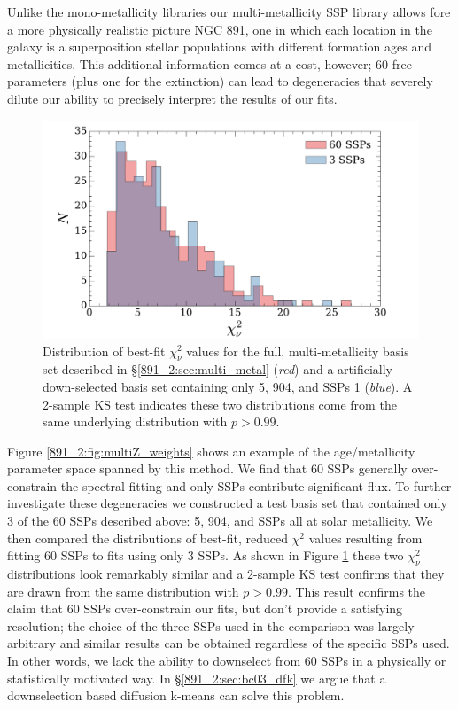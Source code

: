 Unlike the mono-metallicity libraries our multi-metallicity SSP
library allows fore a more physically realistic picture NGC 891, one
in which each location in the galaxy is a superposition stellar
populations with different formation ages and metallicities. This
additional information comes at a cost, however; 60 free parameters
(plus one for the extinction) can lead to degeneracies that severely
dilute our ability to precisely interpret the results of our fits.

\begin{figure}
  \centering
  \includegraphics[width=\columnwidth]{891_2/figs/allz_chihist.pdf}
  \caption[$\chi_{\nu}^2$ distribution for 61 and 4 parameter
    fits]{\fixspacing\label{891_2:fig:3SSP_chi}Distribution of
    best-fit $\chi^2_\nu$ values for the full, multi-metallicity basis
    set described in \S\ref{891_2:sec:multi_metal} (\emph{red}) and a
    artificially down-selected basis set containing only 5, 904, and
     SSPs 1 \Zsol (\emph{blue}). A 2-sample KS test
    indicates these two distributions come from the same underlying
    distribution with $p > 0.99$.}
\end{figure}

Figure \ref{891_2:fig:multiZ_weights} shows an example of the
age/metallicity parameter space spanned by this method. We find that
60 SSPs generally over-constrain the spectral fitting and only 
SSPs contribute significant flux. To further investigate these
degeneracies we constructed a test basis set that contained only 3 of
the 60 SSPs described above: 5, 904, and  SSPs all at
solar metallicity. We then compared the distributions of best-fit,
reduced $\chi^2$ values resulting from fitting 60 SSPs to fits using
only 3 SSPs. As shown in Figure \ref{891_2:fig:3SSP_chi} these two
$\chi^2_\nu$ distributions look remarkably similar and a 2-sample KS
test confirms that they are drawn from the same distribution with $p >
0.99$. This result confirms the claim that 60 SSPs over-constrain our
fits, but don't provide a satisfying resolution; the choice of the
three SSPs used in the comparison was largely arbitrary and similar
results can be obtained regardless of the specific SSPs used. In other
words, we lack the ability to downselect from 60 SSPs in a physically
or statistically motivated way. In \S\ref{891_2:sec:bc03_dfk} we argue that
a downselection based diffusion k-means can solve this problem.

